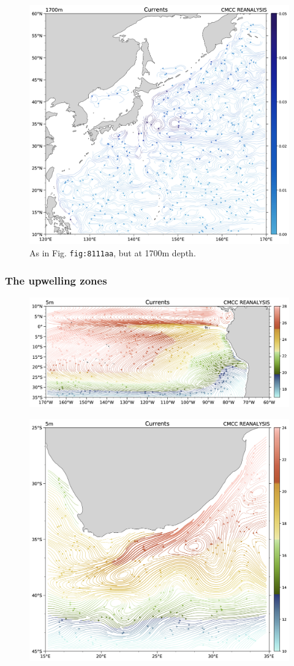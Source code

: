 \begin{figure}
\centering
\includegraphics[width = .7 \textwidth]{figs/GD/UVstream1700mKUR.png}
\caption{As in Fig. \texttt{fig:8111aa}, but at 1700m depth.}
\end{figure}

\subsubsection{The upwelling zones}\label{the-upwelling-zones}

\begin{figure}
\centering
\includegraphics[width = .7 \textwidth]{figs/GD/UVstream5mSATemp.png}
\caption{} \label{fig:}
\end{figure}

\begin{figure}
\centering
\includegraphics[width = .7 \textwidth]{figs/GD/UVstream5mAFRemp.png}
\caption{} \label{fig:}
\end{figure}


